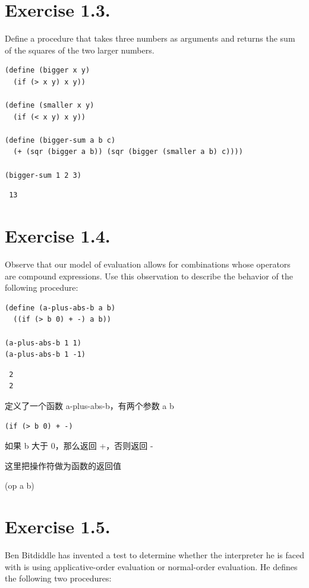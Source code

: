 \documentclass[11pt]{article}
\begin{document}
\section{Exercise 1.3.}
\label{sec-3}


  Define a procedure that takes three numbers as arguments and returns the sum
  of the squares of the two larger numbers.


\begin{verbatim}
(define (bigger x y)
  (if (> x y) x y))

(define (smaller x y)
  (if (< x y) x y))

(define (bigger-sum a b c)
  (+ (sqr (bigger a b)) (sqr (bigger (smaller a b) c))))

(bigger-sum 1 2 3)
\end{verbatim}

\begin{verbatim}
 13
\end{verbatim}
\section{Exercise 1.4.}
\label{sec-4}


  Observe that our model of evaluation allows for combinations whose operators
  are compound expressions. Use this observation to describe the behavior of the
  following procedure:


\begin{verbatim}
(define (a-plus-abs-b a b)
  ((if (> b 0) + -) a b))

(a-plus-abs-b 1 1)
(a-plus-abs-b 1 -1)
\end{verbatim}

\begin{verbatim}
 2
 2
\end{verbatim}

  定义了一个函数 a-plus-abs-b，有两个参数 a b


\begin{verbatim}
(if (> b 0) + -)
\end{verbatim}

  如果 b 大于 0，那么返回 +，否则返回 -

  这里把操作符做为函数的返回值

  (op a b)
\section{Exercise 1.5.}
\label{sec-5}


  Ben Bitdiddle has invented a test to determine whether the interpreter he is
  faced with is using applicative-order evaluation or normal-order evaluation.
  He defines the following two procedures:
\end{document}
